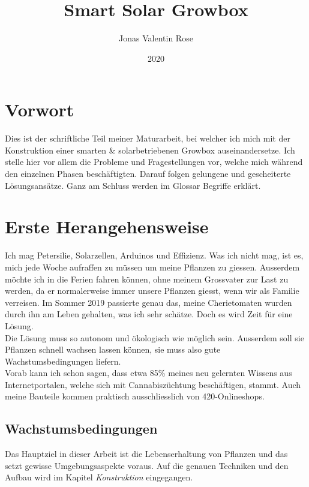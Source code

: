 \documentclass[12pt,titlepage,a4paper]{article}
\begin{document}
\begin{titlepage}
\title{Smart Solar Growbox}
\date{2020}
\author{Jonas Valentin Rose}
\end{titlepage}
\maketitle 
\tableofcontents
\newpage
\section{Vorwort}
Dies ist der schriftliche Teil meiner Maturarbeit, bei welcher ich mich  mit der Konstruktion einer smarten \& solarbetriebenen Growbox auseinandersetze. Ich stelle hier vor allem die Probleme und Fragestellungen vor, welche mich während den einzelnen Phasen beschäftigten. Darauf folgen gelungene und gescheiterte Lösungsansätze. Ganz am Schluss werden im Glossar Begriffe erklärt.

\section{Erste Herangehensweise}
Ich mag Petersilie, Solarzellen, Arduinos und Effizienz. Was ich nicht mag, ist es, mich jede Woche aufraffen zu müssen um meine Pflanzen zu giessen. Ausserdem möchte ich in die Ferien fahren können, ohne meinem Grossvater zur Last zu werden, da er normalerweise immer unsere Pflanzen giesst, wenn wir als Familie verreisen. Im Sommer 2019 passierte genau das, meine Cherietomaten wurden durch ihn am Leben gehalten, was ich sehr schätze. Doch es wird Zeit für eine Lösung. \\Die Lösung muss so autonom und ökologisch wie möglich sein. Ausserdem soll sie Pflanzen schnell wachsen lassen können, sie muss also gute Wachstumsbedingungen liefern. \\ Vorab kann ich schon sagen, dass etwa 85\% meines neu gelernten Wissens aus Internetportalen, welche sich mit Cannabiszüchtung beschäftigen, stammt. Auch meine Bauteile kommen praktisch ausschliesslich von 420-Onlineshops. 
\subsection{Wachstumsbedingungen}
Das Hauptziel in dieser Arbeit ist die Lebenserhaltung von Pflanzen und das setzt gewisse Umgebungsaspekte voraus.
Auf die genauen Techniken und den  Aufbau wird im Kapitel \textit{Konstruktion} eingegangen.
\end{document}
